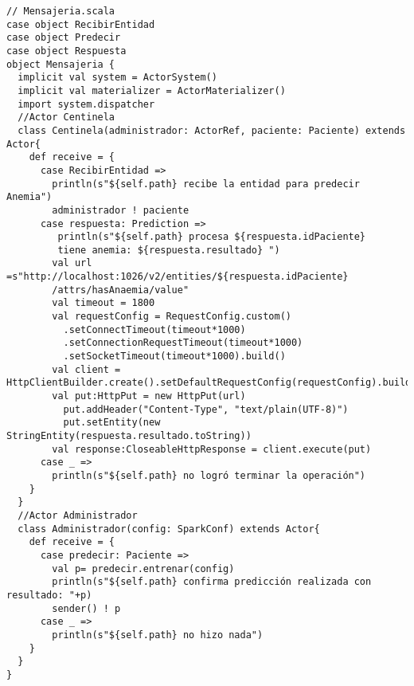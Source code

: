 \newpage
\begin{lstlisting}[caption={Esquema de mensajería}, label={lst:esqMsj},basicstyle=\small]
// Mensajeria.scala
case object RecibirEntidad
case object Predecir
case object Respuesta
object Mensajeria {
  implicit val system = ActorSystem()
  implicit val materializer = ActorMaterializer()
  import system.dispatcher
  //Actor Centinela
  class Centinela(administrador: ActorRef, paciente: Paciente) extends Actor{
    def receive = {
      case RecibirEntidad =>
        println(s"${self.path} recibe la entidad para predecir Anemia")
        administrador ! paciente
      case respuesta: Prediction =>
         println(s"${self.path} procesa ${respuesta.idPaciente} 
         tiene anemia: ${respuesta.resultado} ")
        val url =s"http://localhost:1026/v2/entities/${respuesta.idPaciente}
        /attrs/hasAnaemia/value"
        val timeout = 1800
        val requestConfig = RequestConfig.custom()
          .setConnectTimeout(timeout*1000)
          .setConnectionRequestTimeout(timeout*1000)
          .setSocketTimeout(timeout*1000).build()
        val client = HttpClientBuilder.create().setDefaultRequestConfig(requestConfig).build()
        val put:HttpPut = new HttpPut(url)
          put.addHeader("Content-Type", "text/plain(UTF-8)")
          put.setEntity(new StringEntity(respuesta.resultado.toString))
        val response:CloseableHttpResponse = client.execute(put)
      case _ =>
        println(s"${self.path} no logró terminar la operación")
    }
  }
  //Actor Administrador
  class Administrador(config: SparkConf) extends Actor{
    def receive = {
      case predecir: Paciente =>
        val p= predecir.entrenar(config)
        println(s"${self.path} confirma predicción realizada con resultado: "+p)
        sender() ! p
      case _ =>
        println(s"${self.path} no hizo nada")
    }
  }
}

\end{lstlisting}
